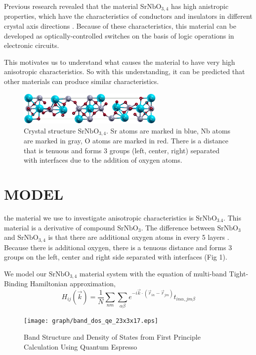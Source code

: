 \documentclass{aip-cp}
\begin{document}
Previous research revealed that the material $\mathrm{SrNbO_{3,4}} $ has high anistropic properties, which have the characteristics of conductors and insulators in different crystal axis directions \cite{andrivo}. Because of these characteristics, this material can be developed as optically-controlled switches on the basis of logic operations in electronic circuits.

This motivates us to understand what causes the material to have very high anisotropic characteristics. So with this understanding, it can be predicted that other materials can produce similar characteristics.

\begin{figure}[b]
  \centerline{\includegraphics[width=200pt]{graph/pwi2xsf.png}}
  \caption{Crystal structure $\mathrm{SrNbO_{3,4}}$. Sr atoms are marked in blue, Nb atoms are marked in gray, O atoms are marked in red. There is a distance that is tenuous and forms 3 groups (left, center, right) separated with interfaces due to the addition of oxygen atoms.}
\end{figure}

\section{MODEL}
the material we use to investigate anisotropic characteristics is $\mathrm{SrNbO_{3.4}}$. This material is a derivative of compound $\mathrm{SrNbO_{3}}$. The difference between $\mathrm{SrNbO_{3}} $ and $ \mathrm{SrNbO_{3,4}} $ is that there are additional oxygen atoms in every 5 layers \cite {Wan2017}. Because there is additional oxygen, there is a tenuous distance and forms 3 groups on the left, center and right side separated with interfaces (Fig 1).

We model our $\mathrm{SrNbO_{3,4}}$ material system with the equation of multi-band Tight-Binding Hamiltonian approximation,
$$ H_{ij}(\vec{k}) = \frac{1}{N}\sum_{nm}\sum_{\alpha \beta}e^{-i\vec{k} \cdot (\vec{r}_{in}-\vec{r}_{jm})} t_{in\alpha, jm\beta} $$

\begin{figure}[t]
  \centerline{\texttt{[image: graph/band\_dos\_qe\_23x3x17.eps]}}
  \caption{Band Structure and Density of States from First Principle Calculation Using Quantum Espresso}
\end{figure}
\end{document}

